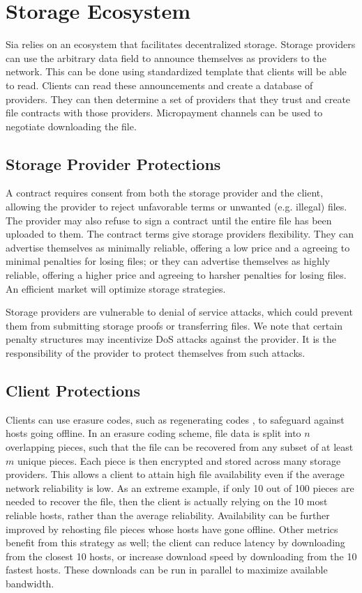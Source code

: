 \documentclass[twocolumn]{article}
\begin{document}
\section{Storage Ecosystem}
Sia relies on an ecosystem that facilitates decentralized storage.
Storage providers can use the arbitrary data field to announce themselves as providers to the network.
This can be done using standardized template that clients will be able to read.
Clients can read these announcements and create a database of providers.
They can then determine a set of providers that they trust and create file contracts with those providers.
Micropayment channels \cite{mpc} can be used to negotiate downloading the file. %

\subsection{Storage Provider Protections}
A contract requires consent from both the storage provider and the client, allowing the provider to reject unfavorable terms or unwanted (e.g. illegal) files.
The provider may also refuse to sign a contract until the entire file has been uploaded to them.
The contract terms give storage providers flexibility.
They can advertise themselves as minimally reliable, offering a low price and a agreeing to minimal penalties for losing files;
or they can advertise themselves as highly reliable, offering a higher price and agreeing to harsher penalties for losing files.
An efficient market will optimize storage strategies.

Storage providers are vulnerable to denial of service attacks, which could prevent them from submitting storage proofs or transferring files.
We note that certain penalty structures may incentivize DoS attacks against the provider.
It is the responsibility of the provider to protect themselves from such attacks.

\subsection{Client Protections}
Clients can use erasure codes, such as regenerating codes \cite{reg}, to safeguard against hosts going offline.
In an erasure coding scheme, file data is split into $n$ overlapping pieces, such that the file can be recovered from any subset of at least $m$ unique pieces.
Each piece is then encrypted and stored across many storage providers.
This allows a client to attain high file availability even if the average network reliability is low.
As an extreme example, if only 10 out of 100 pieces are needed to recover the file, then the client is actually relying on the 10 most reliable hosts, rather than the average reliability.
Availability can be further improved by rehosting file pieces whose hosts have gone offline.
Other metrics benefit from this strategy as well; the client can reduce latency by downloading from the closest 10 hosts, or increase download speed by downloading from the 10 fastest hosts.
These downloads can be run in parallel to maximize available bandwidth.
\end{document}
